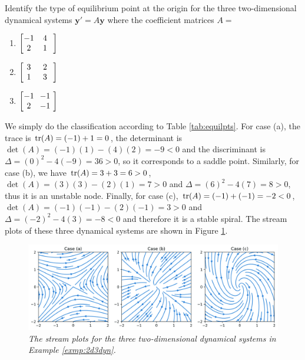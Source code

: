 \begin{exmp}
\label{exmp:2d3dyn}
Identify the type of equilibrium point at the origin for the three two-dimensional dynamical systems $\textbf{y}' = A\textbf{y}$ where the coefficient matrices $A = $ 
\begin{enumerate}[label=(\alph*)]
    \item $\left[\begin{array}{@{\,}wc{10pt}wc{10pt}wc{10pt}@{}}
    -1 & 4 \\
    2 & 1
    \end{array}\right]$
    \item $\left[\begin{array}{@{\,}wc{10pt}wc{10pt}wc{10pt}@{}}
    3 & 2 \\
    1 & 3
    \end{array}\right]$
    \item $\left[\begin{array}{@{\,}wc{10pt}wc{10pt}wc{10pt}@{}}
    -1 & -1 \\
    2 & -1
    \end{array}\right]$
\end{enumerate}
\end{exmp}
\begin{solution}
We simply do the classification according to Table \ref{tab:equilpts}. For case (a), the trace is $\tr(A) = (-1) + 1 = 0$, the determinant is $\det(A) = (-1)(1) - (4)(2) = -9 < 0$ and the discriminant is $\Delta = (0)^2 - 4(-9) = 36 > 0$, so it corresponds to a saddle point. Similarly, for case (b), we have $\tr(A) = 3 + 3 = 6 > 0$, $\det(A) = (3)(3) - (2)(1) = 7 > 0$ and $\Delta = (6)^2 - 4(7) = 8 > 0$, thus it is an unstable node. Finally, for case (c), $\tr(A) = (-1) + (-1) = -2 < 0$, $\det(A) = (-1)(-1) - (2)(-1) = 3 > 0$ and $\Delta = (-2)^2 - 4(3) = -8 < 0$ and therefore it is a stable spiral. The stream plots of these three dynamical systems are shown in Figure \ref{fig:2d3dyn}. 
\end{solution}

\begin{figure}[ht!]
    \centering
    \includegraphics[width=\textwidth]{graphics/3exmps2ddynamic.jpg}
    \caption{\textit{The stream plots for the three two-dimensional dynamical systems in Example \ref{exmp:2d3dyn}.}}
    \label{fig:2d3dyn}
\end{figure}

